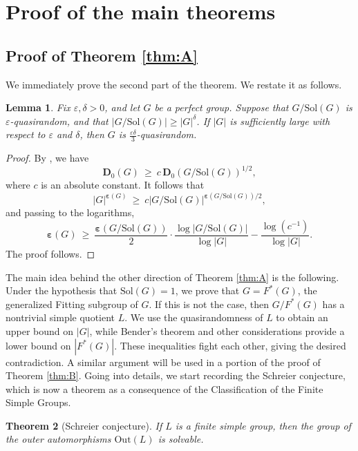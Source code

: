 \documentclass{daj}
\newtheorem{theorem}{Theorem}[section]
\newtheorem{lemma}[theorem]{Lemma}
\theoremstyle{definition}
\theoremstyle{remark}
\newcommand{\Sol}{\mathrm{Sol}}
\newcommand{\Out}{\mathrm{Out}}
\newcommand{\D}{\mathbf{D}}
\renewcommand{\a}{\boldsymbol{\varepsilon}}
\begin{document}
\section{Proof of the main theorems} \label{sec4} 

\subsection{Proof of Theorem \ref{thm:A}} 

We immediately prove the second part of the theorem.
We restate it as follows.

\begin{lemma} \label{lemNew}
	Fix $\varepsilon,\delta >0$, and let $G$ be a perfect group.
	Suppose that $G/\Sol(G)$ is $\varepsilon$-quasirandom, and that $|G/\Sol(G)| \geq |G|^\delta$.
	If $|G|$ is sufficiently large with respect to $\varepsilon$ and $\delta$,
	then $G$ is $\frac{\varepsilon \delta}{3}$-quasirandom.
\end{lemma}
\begin{proof}
By \cite[Lemma 4.10]{EMPS23}, we have
	$$ \D_0(G) \> \geq \> c \, \D_0(G/\Sol(G))^{1/2} , $$
	where $c$ is an absolute constant.
It follows that
$$ |G|^{\a(G)} \> \geq \> c |G/\Sol(G)|^{\a(G/\Sol(G))/2} , $$
and passing to the logarithms,
	$$ \a(G) \> \geq \> \frac{\a(G/\Sol(G))}{2} \cdot \frac{\log|G/\Sol(G)|}{\log|G|} - \frac{\log (c^{-1})}{\log|G|}  . $$
The proof follows.
\end{proof} 

The main idea behind the other direction of Theorem \ref{thm:A} is the following.
Under the hypothesis that $\Sol(G)=1$,
we prove that $G=F^*(G)$, the generalized Fitting subgroup of $G$.
If this is not the case, then $G/F^*(G)$ has a nontrivial simple quotient $L$.
We use the quasirandomness of $L$ to obtain an upper bound on $|G|$,
while Bender's theorem and other considerations provide a lower bound on $|F^*(G)|$.
These inequalities fight each other, giving the desired contradiction.
A similar argument will be used in a portion of the proof of Theorem \ref{thm:B}.
Going into details, we start recording the Schreier conjecture,
which is now a theorem as a consequence of the Classification of the Finite Simple Groups.

\begin{theorem}[Schreier conjecture] \label{thSchreier} 
	If $L$ is a finite simple group, then the group of the outer automorphisms $\Out(L)$ is solvable.
\end{theorem} 
\end{document}
